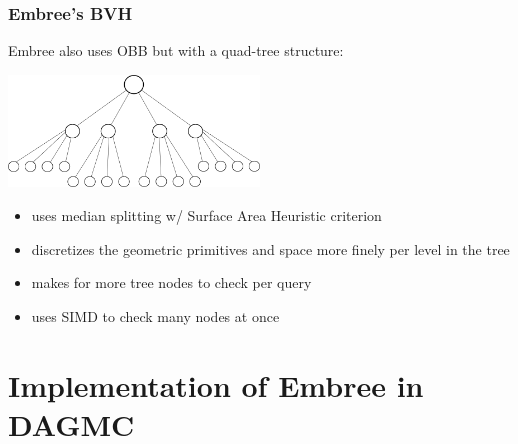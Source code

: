 \documentclass[12pt]{beamer}
\begin{document}
\begin{frame}

\frametitle{Embree's BVH}

Embree also uses OBB but with a quad-tree structure:

\begin{center}
\includegraphics[width=0.5\textwidth]{./images/quad_tree.png}
\end{center}

\begin{itemize}
\item uses median splitting w/ Surface Area Heuristic criterion
\item discretizes the geometric primitives and space more finely per level in the tree
\item makes for more tree nodes to check per query
\item uses SIMD to check many nodes at once
\end{itemize}

\end{frame}


\section{Implementation of Embree in DAGMC} %
\end{document}
